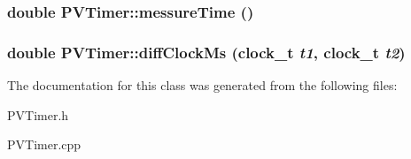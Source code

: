 \subsubsection[{messureTime}]{\setlength{\rightskip}{0pt plus 5cm}double PVTimer::messureTime ()}\label{class_p_v_timer_28722001b6635db85c03f8c2bcdd5073}


\subsubsection[{diffClockMs}]{\setlength{\rightskip}{0pt plus 5cm}double PVTimer::diffClockMs (clock\_\-t {\em t1}, \/  clock\_\-t {\em t2})}\label{class_p_v_timer_bddabecd73093c64294a30aa3144c077}




The documentation for this class was generated from the following files:\begin{CompactItemize}
\item 
PVTimer.h\item 
PVTimer.cpp\end{CompactItemize}
